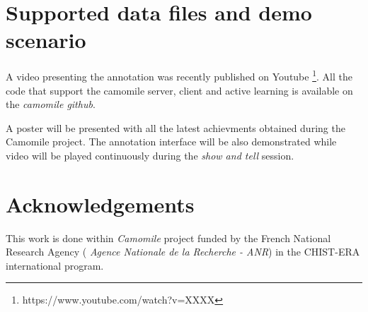 \documentclass[a4paper]{article}
\begin{document}






        \vspace{-0.3cm}
  \section{Supported data files and demo scenario}
          \vspace{-0.1cm}

A video presenting the annotation was recently published on Youtube \footnote{https://www.youtube.com/watch?v=XXXX}. All the code that support the camomile server, client and active learning is available on the \textit{camomile github}.



A poster will be presented with all the latest achievments obtained during the Camomile project. The annotation interface will be also demonstrated while video will be played continuously during the \textit{show and tell} session. %

        \vspace{-0.3cm}
 \section{Acknowledgements}
  
    This work is done within \textit{Camomile} project funded by the French National Research Agency ( \textit{Agence Nationale de la Recherche - ANR}) in the CHIST-ERA international program.

  
  \eightpt
  
  
  
\end{document}
